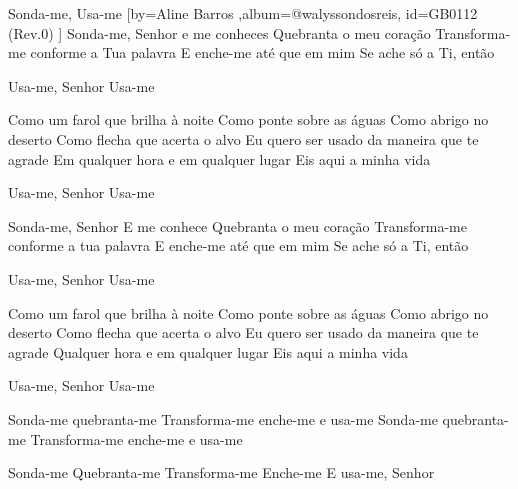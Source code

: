 \beginsong
{Sonda-me, Usa-me %
}[by={Aline Barros %
},album={@walyssondosreis},
id={GB0112 %
(Rev.0) %
}]
Sonda-me, Senhor e me conheces
Quebranta o meu coração
Transforma-me conforme a Tua palavra
E enche-me até que em mim
Se ache só a Ti, então

Usa-me, Senhor
Usa-me

Como um farol que brilha à noite
Como ponte sobre as águas
Como abrigo no deserto
Como flecha que acerta o alvo
Eu quero ser usado da maneira que te agrade
Em qualquer hora e em qualquer lugar
Eis aqui a minha vida

Usa-me, Senhor
Usa-me

Sonda-me, Senhor
E me conhece
Quebranta o meu coração
Transforma-me conforme a tua palavra
E enche-me até que em mim
Se ache só a Ti, então

Usa-me, Senhor
Usa-me

Como um farol que brilha à noite
Como ponte sobre as águas
Como abrigo no deserto
Como flecha que acerta o alvo
Eu quero ser usado da maneira que te agrade
Qualquer hora e em qualquer lugar
Eis aqui a minha vida

Usa-me, Senhor
Usa-me

Sonda-me quebranta-me
Transforma-me enche-me e usa-me
Sonda-me quebranta-me
Transforma-me enche-me e usa-me

Sonda-me
Quebranta-me
Transforma-me
Enche-me
E usa-me, Senhor


